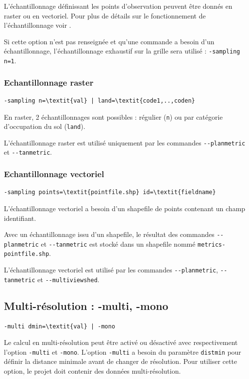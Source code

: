 \documentclass{report}
\begin{document}
L'échantillonnage définissant les points d'observation peuvent être donnés en raster ou en vectoriel. Pour plus de détails sur le fonctionnement de l'échantillonnage voir .

Si cette option n'est pas renseignée et qu'une commande a besoin d'un échantillonnage, l'échantillonnage exhaustif sur la grille sera utilisé : \verb|-sampling n=1|.

\subsubsection{Echantillonnage raster}
\begin{Verbatim}[commandchars=\\\{\}]
-sampling n=\textit{val} | land=\textit{code1,..,coden}
\end{Verbatim}
En raster, 2 échantillonnages sont possibles : régulier (\verb|n|) ou par catégorie d'occupation du sol (\verb|land|).

L'échantillonnage raster est utilisé uniquement par les commandes \verb|--planmetric| et  \verb|--tanmetric|.

\subsubsection{Echantillonnage vectoriel}
\begin{Verbatim}[commandchars=\\\{\}]
-sampling points=\textit{pointfile.shp} id=\textit{fieldname}
\end{Verbatim}
L'échantillonnage vectoriel a besoin d'un shapefile de points contenant un champ identifiant.

Avec un échantillonnage issu d'un shapefile, le résultat des commandes \verb|--planmetric| et \verb|--tanmetric| est stocké dans un shapefile nommé \verb|metrics-pointfile.shp|.

L'échantillonnage vectoriel est utilisé par les commandes \verb|--planmetric|,  \verb|--tanmetric| et \verb|--multiviewshed|.


\subsection{Multi-résolution : -multi, -mono}
\begin{Verbatim}[commandchars=\\\{\}]
-multi dmin=\textit{val} | -mono
\end{Verbatim}

Le calcul en multi-résolution peut être activé ou désactivé avec respectivement l'option \verb|-multi| et \verb|-mono|. 
L'option \verb|-multi| a besoin du paramètre \verb|distmin| pour définir la distance minimale avant de changer de résolution. Pour utiliser cette option, le projet doit contenir des données multi-résolution. 
\end{document}
